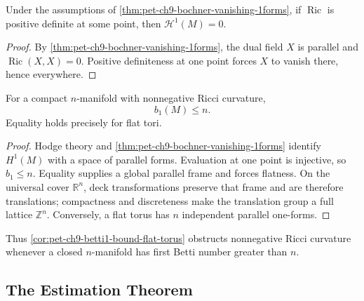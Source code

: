 \begin{corollary}
  \label{cor:pet-ch9-harmonic-1forms-vanish-positive-ricci}

  Under the assumptions of \cref{thm:pet-ch9-bochner-vanishing-1forms}, if
  $\operatorname{Ric}$ is positive definite at some point, then
  $\mathcal H^1(M)=0$.
\end{corollary}
\begin{proof}
  \sketch
  By \cref{thm:pet-ch9-bochner-vanishing-1forms}, the dual field \(X\) is
  parallel and \(\operatorname{Ric}(X,X)=0\).  Positive definiteness at one
  point forces \(X\) to vanish there, hence everywhere.
\end{proof}

\begin{corollary}
  \label{cor:pet-ch9-betti1-bound-flat-torus}

  For a compact $n$-manifold with nonnegative Ricci curvature,
  \[
    b_1(M)\le n.
  \]
  Equality holds precisely for flat tori.
\end{corollary}
\begin{proof}
  \sketch
  Hodge theory and \cref{thm:pet-ch9-bochner-vanishing-1forms} identify
  \(H^1(M)\) with a space of parallel forms.  Evaluation at one point is
  injective, so \(b_1\le n\).  Equality supplies a global parallel frame and
  forces flatness.  On the universal cover \(\mathbb R^n\), deck
  transformations preserve that frame and are therefore translations;
  compactness and discreteness make the translation group a full lattice
  \(\mathbb Z^n\).  Conversely, a flat torus has \(n\) independent parallel
  one-forms.
\end{proof}

Thus \cref{cor:pet-ch9-betti1-bound-flat-torus} obstructs nonnegative Ricci
curvature whenever a closed $n$-manifold has first Betti number greater than
$n$.

\subsection{The Estimation Theorem}

